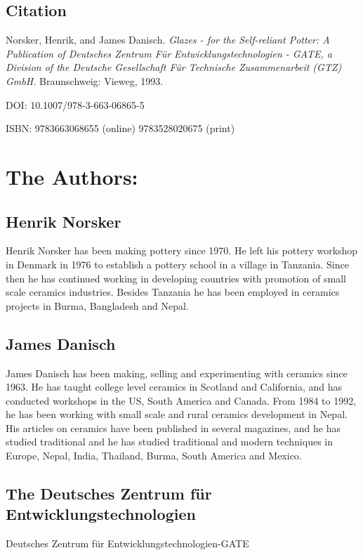 \subsection*{Citation}

Norsker, Henrik, and James Danisch. \textit{Glazes - for the Self-reliant 
  Potter: A Publication of Deutsches Zentrum F\"{u}r Entwicklungstechnologien - 
  GATE, a Division of the Deutsche Gesellschaft F\"{u}r Technische 
  Zusammenarbeit 
  (GTZ) GmbH.} Braunschweig: Vieweg, 1993.

DOI: 10.1007/978-3-663-06865-5

ISBN: 9783663068655 (online) 9783528020675 (print)
\newpage
\section*{The Authors:}
\subsection*{Henrik Norsker} 
Henrik Norsker has been making pottery since 1970. He left his 
pottery workshop in Denmark in 1976 to establish a pottery school in a village 
in Tanzania. Since then he has continued working in developing countries with 
promotion of small scale ceramics industries. Besides Tanzania he has been 
employed in ceramics projects in Burma, Bangladesh and Nepal.
\subsection*{James Danisch} 
James Danisch has been making, selling and experimenting with 
ceramics since 1963. He has taught college level ceramics in Scotland and 
California, and has conducted workshops in the US, South America and Canada. 
From 1984 to 1992, he has been working with small scale and rural ceramics 
development in Nepal. His articles on ceramics have been published in several 
magazines, and he has studied traditional and he has studied traditional and 
modern techniques in Europe, Nepal, India, Thailand, Burma, South America and 
Mexico.
\subsection*{The Deutsches Zentrum f\"{u}r Entwicklungstechnologien}
Deutsches Zentrum f\"{u}r Entwicklungstechnologien-GATE

